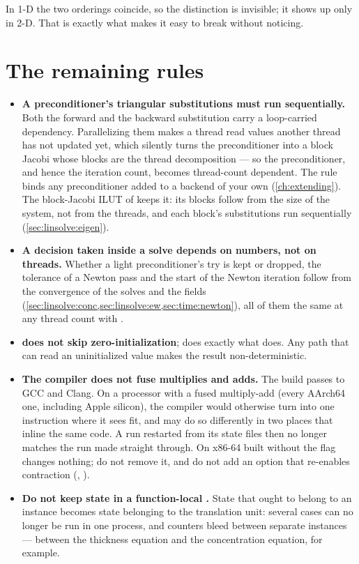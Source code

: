 In 1-D the two orderings coincide, so the distinction is invisible; it shows up
only in 2-D. That is exactly what makes it easy to break without noticing.

\section{The remaining rules}
\label{sec:repro:other}

\begin{itemize}
  \item \textbf{A preconditioner's triangular substitutions must run
    sequentially.} Both the forward and the backward substitution carry a
    loop-carried dependency. Parallelizing them makes a thread read values
    another thread has not updated yet, which silently turns the
    preconditioner into a block Jacobi whose blocks are the thread
    decomposition --- so the preconditioner, and hence the iteration count,
    becomes thread-count dependent. The rule binds any preconditioner added to
    a backend of your own (\cref{ch:extending}). The block-Jacobi ILUT of
     keeps it: its blocks follow from the size of the system,
    not from the threads, and each block's substitutions run sequentially
    (\cref{sec:linsolve:eigen}).
  \item \textbf{A decision taken inside a solve depends on numbers, not on
    threads.} Whether a light preconditioner's try is kept or dropped, the
    tolerance of a Newton pass and the start of the Newton iteration follow
    from the convergence of the solves and the fields
    (\cref{sec:linsolve:conc,sec:linsolve:ew,sec:time:newton}), all of them
    the same at any thread count with .
  \item \textbf{ does not skip zero-initialization};
     does exactly what  does. Any path that
    can read an uninitialized value makes the result non-deterministic.
  \item \textbf{The compiler does not fuse multiplies and adds.} The build
    passes  to GCC and Clang. On a processor with a
    fused multiply-add (every AArch64 one, including Apple silicon), the
    compiler would otherwise turn  into one instruction where it
    sees fit, and may do so differently in two places that inline the same
    code. A run restarted from its state files then no longer matches the run
    made straight through. On x86-64 built without  the flag
    changes nothing; do not remove it, and do not add an option that
    re-enables contraction (, ).
  \item \textbf{Do not keep state in a function-local .} State
    that ought to belong to an instance becomes state belonging to the
    translation unit: several cases can no longer be run in one process, and
    counters bleed between separate instances --- between the thickness
    equation and the concentration equation, for example.
\end{itemize}
